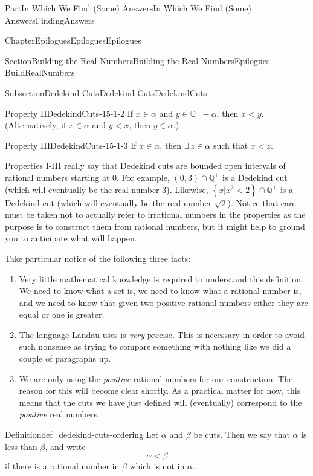 \documentclass[oneside,10pt,]{book}
\numberwithin{equation}{part}
\newcommand{\QQ}{\mathbb {Q}}
\newcommand{\lt}{<}
\begin{document}
\begin{partptx}{Part}{In Which We Find (Some) Answers}{}{In Which We Find (Some) Answers}{}{}{FindingAnswers}
\begin{chapterptx}{Chapter}{Epilogues}{}{Epilogues}{}{}{Epilogues}
\begin{sectionptx}{Section}{Building the Real Numbers}{}{Building the Real Numbers}{}{}{Epilogues-BuildRealNumbers}
\begin{subsectionptx}{Subsection}{Dedekind Cuts}{}{Dedekind Cuts}{}{}{DedekindCuts}
\begin{descriptionlist}
\begin{dlimedium}{Property II}{DedekindCuts-15-1-2}
If \(x\in\alpha\) and \(y\in\QQ^+-\alpha\), then \(x\lt y\). (Alternatively, if \(x\in\alpha\) and \(y\lt x\), then \(y\in\alpha\).)%
\end{dlimedium}%
\begin{dlimedium}{Property III}{DedekindCuts-15-1-3}%
If \(x\in\alpha\), then \(\exists\ z\in\alpha\) such that \(x\lt z\).%
\end{dlimedium}%
\end{descriptionlist}
%
\par
Properties I-III really say that Dedekind cuts are bounded open intervals of rational numbers starting at \(0\). For example, \((0,3)\cap\QQ^+\) is a Dedekind cut (which will eventually be the real number \(3\)).  Likewise, \(\left\{x|x^2\lt 2\right\}\cap\QQ^+\) is a Dedekind cut (which will eventually be the real number \(\sqrt{2}\)). Notice that care must be taken not to actually refer to irrational numbers in the properties as the purpose is to construct them from rational numbers, but it might help to ground you to anticipate what will happen.%
\par
Take particular notice of the following three facts:%
\begin{enumerate}
\item{}Very little mathematical knowledge is required to understand this definition.  We need to know what a set is, we need to know what a rational number is, and we need to know that given two positive rational numbers either they are equal or one is greater.%
\item{}The language Landau uses is \emph{very} precise. This is necessary in order to avoid such nonsense as trying to compare something with nothing like we did a couple of paragraphs up.%
\item{}We are only using the \emph{positive} rational numbers for our construction.  The reason for this will become clear shortly.  As a practical matter for now, this means that the cuts we have just defined will (eventually) correspond to the \emph{positive} real numbers.%
\end{enumerate}
%
\begin{definition}{Definition}{}{def_dedekind-cuts-ordering}%
%
Let \(\alpha\) and \(\beta\) be cuts.  Then we say that \(\alpha\) is less than \(\beta\), and write%
\begin{equation*}
\alpha\lt \beta
\end{equation*}
if there is a rational number in \(\beta\) which is not in \(\alpha\).%

\end{definition}
\end{subsectionptx}
\end{sectionptx}
\end{chapterptx}
\end{partptx}
\end{document}
